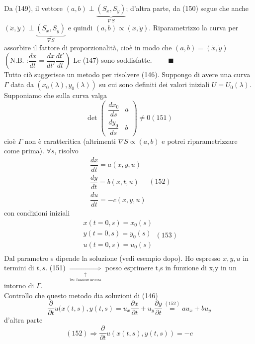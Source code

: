 \documentclass[a4paper,11pt]{report}
\begin{document}
Da (149), il vettore $(a,b) \perp \underset{\nabla S}{\underbrace{(S_x,S_y)}}$; d'altra parte, da (150) segue che anche $(\dot{x},\dot{y}) \perp \underset{\nabla S}{\underbrace{(S_x,S_y)}}$ e quindi $(a,b)\propto (\dot{x},\dot{y})$. Riparametrizzo la curva per assorbire il fattore di proporzionalità, cioè in modo che $(a,b)=(\dot{x},\dot{y})$ $\left( \text{N.B. :} \dfrac{dx}{dt}=\dfrac{dx}{dt'}\dfrac{dt'}{dt}\right)$
Le (147) sono soddisfatte. $\qquad \blacksquare$\\
Tutto ciò suggerisce un metodo per risolvere (146). Suppongo di avere una curva $\Gamma$ data da $(x_0(\lambda),y_0(\lambda))$ su cui sono definiti dei valori iniziali $U=U_0(\lambda)$. Supponiamo che sulla curva valga
\begin{equation}
\det \left(\begin{matrix}
\dfrac{dx_0}{ds} & a \\
\dfrac{dy_0}{ds} & b
\end{matrix}\right)\neq 0(151)
\end{equation}
cioè $\Gamma$ non è caratteritica (altrimenti $\nabla S \propto (a,b)$ e potrei riparametrizzare come prima). $\forall s$, risolvo 
\begin{equation}
\begin{matrix}
\dfrac{dx}{dt}=a(x,y,u) \\
\dfrac{dy}{dt}=b(x,t,u) \\
\dfrac{du}{dt}=-c(x,y,u)
\end{matrix} (152)
\end{equation}
con condizioni iniziali
\begin{equation}
\begin{matrix}
x(t=0,s)=x_0(s) \\
y(t=0,s)=y_0(s) \\
u(t=0,s)=u_0(s) \\
\end{matrix} (153)
\end{equation}
Dal parametro s dipende la soluzione (vedi esempio dopo). Ho espresso $x,y,u$ in termini di $t,s$.
(151) $\underset{\underset{\text{teo. funzione inversa}}{\uparrow}}{\Rightarrow}$ posso esprimere  t,s in funzione di x,y in un intorno di $\Gamma$.\\
Controllo che questo metodo dia soluzioni di (146)
$$
\dfrac{\partial}{\partial t}u(x(t,s),y(t,s)=u_x \dfrac{\partial x}{\partial t} + u_y \dfrac{\partial y}{\partial t}\overset{(152)}{=}au_x + bu_y
$$
d'altra parte
$$
(152) \Rightarrow  \dfrac{\partial }{\partial t} u(x(t,s),y(t,s))=-c
$$
\end{document}
